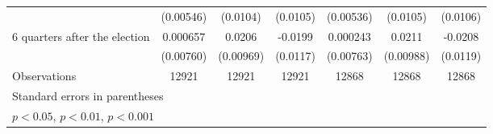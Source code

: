 \begin{table}[!ht]
\begin{tabular}{l*{6}{c}}
                    &   (0.00546)         &    (0.0104)         &    (0.0105)         &   (0.00536)         &    (0.0105)         &    (0.0106)         \\
[1em]
 6 quarters after the election&    0.000657         &      0.0206\sym{*}  &     -0.0199         &    0.000243         &      0.0211\sym{*}  &     -0.0208         \\
                    &   (0.00760)         &   (0.00969)         &    (0.0117)         &   (0.00763)         &   (0.00988)         &    (0.0119)         \\
\hline
Observations        &       12921         &       12921         &       12921         &       12868         &       12868         &       12868         \\
\hline\hline
\multicolumn{7}{l}{\footnotesize Standard errors in parentheses}\\
\multicolumn{7}{l}{\footnotesize \sym{*} \(p<0.05\), \sym{**} \(p<0.01\), \sym{***} \(p<0.001\)}\\
\end{tabular}
\end{table}

